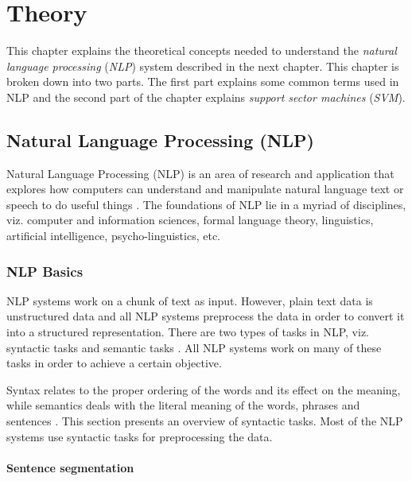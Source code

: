 \chapter{Theory}\label{chapter:theory}

This chapter explains the theoretical concepts needed to understand the \emph{natural language processing} (\emph{NLP}) system described in the next chapter. This chapter is broken down into two parts. The first part explains some common terms used in NLP and the second part of the chapter explains \emph{support sector machines} (\emph{SVM}).

\section{Natural Language Processing (NLP)}

Natural Language Processing (NLP) is an area of research and application that explores how computers can understand and manipulate natural language text or speech to do useful things \cite{chowdhury2003natural}. The foundations of NLP lie in a myriad of disciplines, viz. computer and information sciences, formal language theory, linguistics, artificial intelligence, psycho-linguistics, etc.

\subsection{NLP Basics}\label{sec:NLPPipeline}

NLP systems work on a chunk of text as input. However, plain text data is unstructured data and all NLP systems preprocess the data in order to convert it into a structured representation. There are two types of tasks in NLP, viz. syntactic tasks and semantic tasks \cite{nlpcourse}. All NLP systems work on many of these tasks in order to achieve a certain objective.

Syntax relates to the proper ordering of the words and its effect on the meaning, while semantics deals with the literal meaning of the words, phrases and sentences \cite{wiki:sentSeg}. This section presents an overview of syntactic tasks. Most of the NLP systems use syntactic tasks for preprocessing the data.


\subsubsection{Sentence segmentation}

